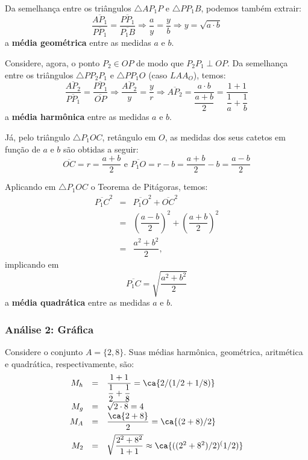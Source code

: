 {Da semelhança entre os triângulos \(\triangle AP_1P\) e \(\triangle PP_1B\), podemos também extrair:
\[\dfrac{\overline{AP_1}}{\overline{PP_1}} = \dfrac{\overline{PP_1}}{\overline{P_1B}}
\Rightarrow
\dfrac{a}{y} = \dfrac{y}{b}
\Rightarrow
y = \sqrt{a \cdot b}
\]
a \textbf{média geométrica} entre as medidas \(a\) e \(b\).%


Considere, agora, o ponto \(P_2 \in OP\) de modo que \(P_2P_1 \perp OP\). Da semelhança entre os triângulos \(\triangle PP_2P_1\) e \(\triangle PP_1O\) (caso \(LAA_O\)), temos:
\[\dfrac{\overline{AP_2}}{\overline{PP_1}} = \dfrac{\overline{PP_1}}{\overline{OP}}
\Rightarrow
\dfrac{\overline{AP_2}}{y} = \dfrac{y}{r}
\Rightarrow
\overline{AP_2} = \dfrac{a \cdot b}{\dfrac{a+b}{2}} = \dfrac{1+1}{\dfrac{1}{a}+\dfrac{1}{b}}
\]
a \textbf{média harmônica} entre as medidas \(a\) e \(b\).


Já, pelo triângulo \(\triangle P_1OC\), retângulo em \(O\), as medidas dos seus catetos em função de \(a\) e \(b\) são obtidas a seguir:
\[\overline{OC} = r = \dfrac{a+b}{2} \mbox{ e } \overline{P_1O} = r - b = \dfrac{a+b}{2}-b = \dfrac{a-b}{2}\]

Aplicando em \(\triangle P_1OC\) o Teorema de Pitágoras, temos:
\[\begin{array}{rcl}
\overline{P_1C}^2
&=& \overline{P_1O}^2+\overline{OC}^2 \\
&=& \left(\dfrac{a-b}{2}\right)^2+\left(\dfrac{a+b}{2}\right)^2 \\
&=& \dfrac{a^2+b^2}{2},
\end{array}\]
implicando em
\[\overline{P_1C} = \sqrt{\dfrac{a^2+b^2}{2}}\]
a \textbf{média quadrática} entre as medidas \(a\) e \(b\).



\subsubsection*{Análise 2: Gráfica}


Considere o conjunto \(A = \{2, 8\}\). Suas médias harmônica, geométrica, aritmética e quadrática, respectivamente, são:
\[\begin{array}{rcl}
M_h &=& \dfrac{1+1}{\dfrac{1}{2}+\dfrac{1}{8}} = \ca{2/(1/2+1/8)} \\
M_g &=& \sqrt{2 \cdot 8} = 4 \\ %
M_A &=& \dfrac{\ca{2+8}}{2} = \ca{(2+8)/2} \\[0.3cm]
M_2 &=& \sqrt{\dfrac{2^2+8^2}{1+1}} \approx \ca{((2^2+8^2)/2)^(1/2)}
\end{array}\]

}
